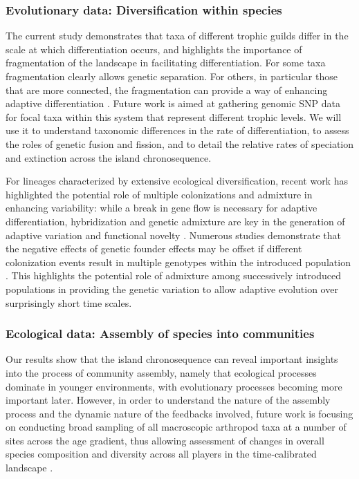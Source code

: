 \documentclass[12pt]{article}
\begin{document}
\begin{linenumbers}
\subsubsection*{Evolutionary data: Diversification within species}

The current study demonstrates that taxa of different trophic guilds
differ in the scale at which differentiation occurs, and highlights
the importance of fragmentation of the landscape in facilitating
differentiation. For some taxa fragmentation clearly allows genetic
separation. For others, in particular those that are more connected,
the fragmentation can provide a way of enhancing adaptive
differentiation \citep{gillespie2014}. Future work is aimed at
gathering genomic SNP data for focal taxa within this system that
represent different trophic levels. We will use it to understand
taxonomic differences in the rate of differentiation, to assess the
roles of genetic fusion and fission, and to detail the relative rates
of speciation and extinction across the island chronosequence.

For lineages characterized by extensive ecological diversification,
recent work has highlighted the potential role of multiple
colonizations and admixture in enhancing variability: while a break in
gene flow is necessary for adaptive differentiation, hybridization and
genetic admixture are key in the generation of adaptive variation and
functional novelty \citep{seehausen2004, rius2014}. Numerous studies
demonstrate that the negative effects of genetic founder effects may
be offset if different colonization events result in multiple
genotypes within the introduced population \citep[see][and citations
therein]{rius2014}. This highlights the potential role of admixture
among successively introduced populations in providing the genetic
variation to allow adaptive evolution over surprisingly short time
scales.


\subsubsection*{Ecological data: Assembly of species into communities}

Our results show that the island chronosequence can reveal important
insights into the process of community assembly, namely that
ecological processes dominate in younger environments, with
evolutionary processes becoming more important later. However, in
order to understand the nature of the assembly process and the dynamic
nature of the feedbacks involved, future work is focusing on
conducting broad sampling of all macroscopic arthropod taxa at a
number of sites across the age gradient, thus allowing assessment of
changes in overall species composition and diversity across all
players in the time-calibrated landscape \citep[{\it
  sensu}][]{gruner2007}.


\end{linenumbers}
\end{document}
